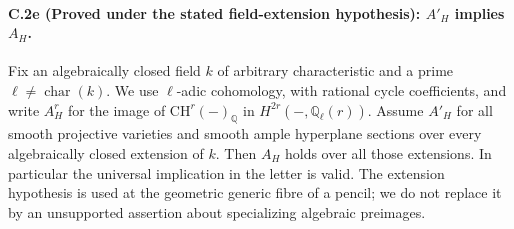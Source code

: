 \paragraph{C.2e (Proved under the stated field-extension hypothesis): $A'_H$ implies $A_H$.}
Fix an algebraically closed field $k$ of arbitrary characteristic and a
prime $\ell\ne\operatorname{char}(k)$. We use $\ell$-adic cohomology,
with rational cycle coefficients, and write $A^r_H$ for the image of
$\mathrm{CH}^r(-)_{\mathbb Q}$ in $H^{2r}(-,\mathbb Q_\ell(r))$.
Assume $A'_H$ for all smooth projective varieties and smooth ample
hyperplane sections over every algebraically closed extension of $k$.
Then $A_H$ holds over all those extensions. In particular the universal
implication in the letter is valid. The extension hypothesis is used
at the geometric generic fibre of a pencil; we do not replace it by
an unsupported assertion about specializing algebraic preimages.

